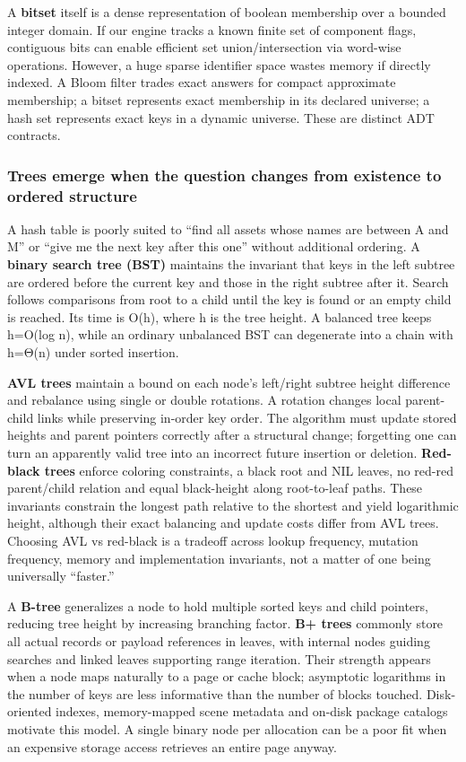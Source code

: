 A \textbf{bitset} itself is a dense representation of boolean membership over a bounded integer domain. If our engine tracks a known finite set of component flags, contiguous bits can enable efficient set union/intersection via word-wise operations. However, a huge sparse identifier space wastes memory if directly indexed. A Bloom filter trades exact answers for compact approximate membership; a bitset represents exact membership in its declared universe; a hash set represents exact keys in a dynamic universe. These are distinct ADT contracts.

\subsubsection{Trees emerge when the question changes from existence to ordered structure}\label{trees-emerge-when-the-question-changes-from-existence-to-ordered-structure}

A hash table is poorly suited to ``find all assets whose names are between A and M'' or ``give me the next key after this one'' without additional ordering. A \textbf{binary search tree (BST)} maintains the invariant that keys in the left subtree are ordered before the current key and those in the right subtree after it. Search follows comparisons from root to a child until the key is found or an empty child is reached. Its time is O(h), where h is the tree height. A balanced tree keeps h=O(log n), while an ordinary unbalanced BST can degenerate into a chain with h=Θ(n) under sorted insertion.

\textbf{AVL trees} maintain a bound on each node's left/right subtree height difference and rebalance using single or double rotations. A rotation changes local parent-child links while preserving in-order key order. The algorithm must update stored heights and parent pointers correctly after a structural change; forgetting one can turn an apparently valid tree into an incorrect future insertion or deletion. \textbf{Red-black trees} enforce coloring constraints, a black root and NIL leaves, no red-red parent/child relation and equal black-height along root-to-leaf paths. These invariants constrain the longest path relative to the shortest and yield logarithmic height, although their exact balancing and update costs differ from AVL trees. Choosing AVL vs red-black is a tradeoff across lookup frequency, mutation frequency, memory and implementation invariants, not a matter of one being universally ``faster.''

A \textbf{B-tree} generalizes a node to hold multiple sorted keys and child pointers, reducing tree height by increasing branching factor. \textbf{B+ trees} commonly store all actual records or payload references in leaves, with internal nodes guiding searches and linked leaves supporting range iteration. Their strength appears when a node maps naturally to a page or cache block; asymptotic logarithms in the number of keys are less informative than the number of blocks touched. Disk-oriented indexes, memory-mapped scene metadata and on-disk package catalogs motivate this model. A single binary node per allocation can be a poor fit when an expensive storage access retrieves an entire page anyway.

